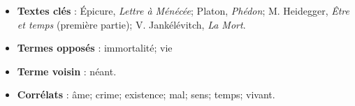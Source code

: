 \begin{itemize}[leftmargin=1cm, label=, itemsep=1pt]
\item {\bf Textes clés} : Épicure, {\it Lettre à Ménécée}; Platon, {\it Phédon}; M. Heidegger, {\it Être et temps} (première partie); V. Jankélévitch, {\it La Mort}.
\item {\bf Termes opposés} : immortalité; vie
\item {\bf Terme voisin} : néant.
\item {\bf Corrélats} : âme; crime; existence; mal; sens; temps; vivant.
\end{itemize}


